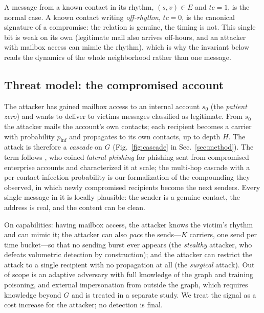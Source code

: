 \noindent A message from a known contact in its rhythm, $(s,v)\in E$ and $tc=1$, is the normal case. A known
contact writing \emph{off-rhythm}, $tc=0$, is the canonical signature of a compromise: the relation is
genuine, the timing is not. This single bit is weak on its own (legitimate mail also arrives off-hours, and an
attacker with mailbox access can mimic the rhythm), which is why the invariant below reads the dynamics of the
whole neighborhood rather than one message.

\subsection{Threat model: the compromised account}
\label{sec:threat}
The attacker has gained mailbox access to an internal account $s_0$ (the \emph{patient zero}) and wants to
deliver to victims messages classified as legitimate. From $s_0$ the attacker mails the account's own
contacts; each recipient becomes a carrier with probability $p_\mathrm{inf}$ and propagates to its own
contacts, up to depth $H$. The attack is therefore a \emph{cascade} on $G$ (Fig.~\ref{fig:cascade} in
Sec.~\ref{sec:method}). The term follows \citet{ho2019detecting}, who coined \emph{lateral phishing} for
phishing sent from compromised enterprise accounts and characterized it at scale; the multi-hop cascade with
a per-contact infection probability is our formalization of the compounding they observed, in which newly
compromised recipients become the next senders. Every single message in it is locally plausible: the sender is a genuine contact,
the address is real, and the content can be clean.

On capabilities: having mailbox access, the attacker knows the victim's rhythm and can mimic it; the attacker
can also \emph{pace} the sends---$K$ carriers, one send per time bucket---so that no sending burst ever appears
(the \emph{stealthy} attacker, who defeats volumetric detection by construction); and the attacker can restrict
the attack to a single recipient with no propagation at all (the \emph{surgical} attack). Out of scope is an
adaptive adversary with full knowledge of the graph and training poisoning, and external impersonation from
outside the graph, which requires knowledge beyond $G$ and is treated in a separate study. We treat the signal
as a cost increase for the attacker; no detection is final.

